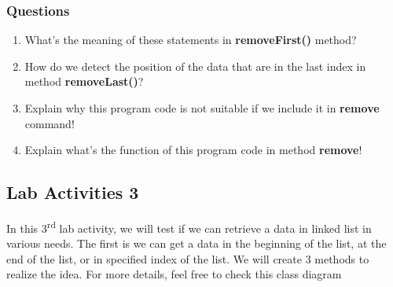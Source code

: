 \documentclass[12pt,titlepage]{article}
\begin{document}
\subsubsection{Questions}
\begin{enumerate}
    \item What’s the meaning of these statements in \textbf{removeFirst()} method?
    \item How do we detect the position of the data that are in the last index in method \textbf{removeLast()}?
    \item Explain why this program code is not suitable if we include it in \textbf{remove} command!
    \item Explain what’s the function of this program code in method \textbf{remove}!
\end{enumerate}

\subsection{Lab Activities 3}
In this 3\textsuperscript{rd} lab activity, we will test if we can retrieve a data in linked list in various needs. The first is we can get a data in the beginning of the list, at the end of the list, or in specified index of the list. We will create 3 methods to realize the idea. For more details, feel free to check this class diagram
\mbox{}\\
\mbox{}\\
\mbox{}\\
\end{document}

